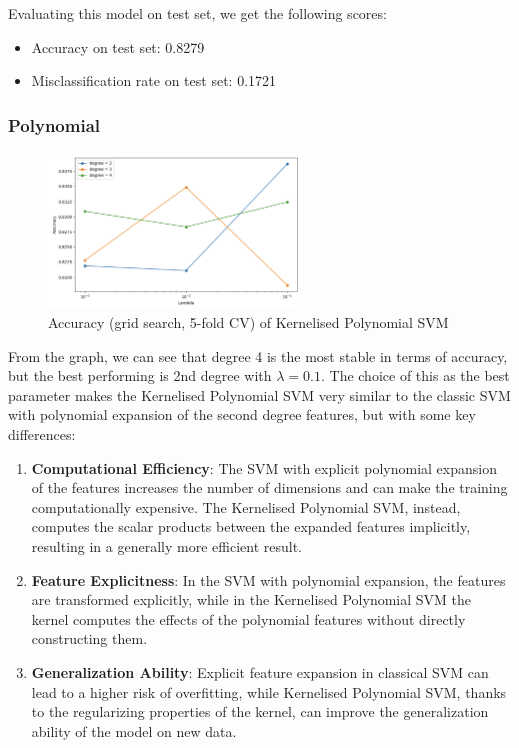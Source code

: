 \documentclass[a4paper, 10pt]{article}
\begin{document}
Evaluating this model on test set, we get the following scores:
\begin{itemize}
    \item Accuracy on test set: 0.8279
    \item Misclassification rate on test set: 0.1721
\end{itemize}

\subsubsection{Polynomial}

\begin{figure}[H]
    \centering
    \includegraphics[width=0.6\textwidth]{images/accKSVMP.png}
    \caption{Accuracy (grid search, 5-fold CV) of Kernelised Polynomial SVM}
    \label{fig:accKSVMP}
\end{figure}

From the graph, we can see that degree 4 is the most stable in terms of accuracy, but the best performing is 2nd degree with \(\lambda = 0.1\). The choice of this as the best parameter makes the Kernelised Polynomial SVM very similar to the classic SVM with polynomial expansion of the second degree features, but with some key differences:


\begin{enumerate}
\item \textbf{Computational Efficiency}: The SVM with explicit polynomial expansion of the features increases the number of dimensions and can make the training computationally expensive. The Kernelised Polynomial SVM, instead, computes the scalar products between the expanded features implicitly, resulting in a generally more efficient result.
\item \textbf{Feature Explicitness}: In the SVM with polynomial expansion, the features are transformed explicitly, while in the Kernelised Polynomial SVM the kernel computes the effects of the polynomial features without directly constructing them.
\item \textbf{Generalization Ability}: Explicit feature expansion in classical SVM can lead to a higher risk of overfitting, while Kernelised Polynomial SVM, thanks to the regularizing properties of the kernel, can improve the generalization ability of the model on new data.
\end{enumerate}
\end{document}
